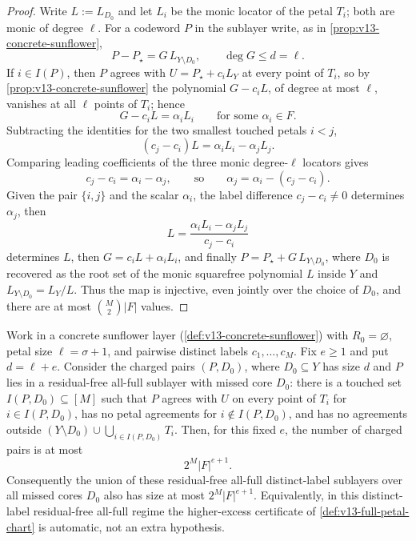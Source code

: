 \begin{proof}
Write $L:=L_{D_0}$ and let $L_i$ be the monic locator of the petal $T_i$; both are monic of degree $\ell$.  For a codeword $P$ in the sublayer write, as in \cref{prop:v13-concrete-sunflower},
\[
        P-P_\star=G\,L_{Y\setminus D_0},
        \qquad \deg G\le d=\ell .
\]
If $i\in I(P)$, then $P$ agrees with $U=P_\star+c_iL_Y$ at every point of $T_i$, so by \cref{prop:v13-concrete-sunflower} the polynomial $G-c_iL$, of degree at most $\ell$, vanishes at all $\ell$ points of $T_i$; hence
\[
        G-c_iL=\alpha_iL_i
        \qquad\text{for some }\alpha_i\in F .
\]
Subtracting the identities for the two smallest touched petals $i<j$,
\[
        (c_j-c_i)L=\alpha_iL_i-\alpha_jL_j .
\]
Comparing leading coefficients of the three monic degree-$\ell$ locators gives
\[
        c_j-c_i=\alpha_i-\alpha_j,
        \qquad\text{so}\qquad
        \alpha_j=\alpha_i-(c_j-c_i).
\]
Given the pair $\{i,j\}$ and the scalar $\alpha_i$, the label difference $c_j-c_i\ne0$ determines $\alpha_j$, then
\[
        L=\frac{\alpha_iL_i-\alpha_jL_j}{c_j-c_i}
\]
determines $L$, then $G=c_iL+\alpha_iL_i$, and finally $P=P_\star+G\,L_{Y\setminus D_0}$, where $D_0$ is recovered as the root set of the monic squarefree polynomial $L$ inside $Y$ and $L_{Y\setminus D_0}=L_Y/L$.  Thus the map is injective, even jointly over the choice of $D_0$, and there are at most $\binom M2|F|$ values.
\end{proof}

\begin{proposition}\label{prop:v13-distinct-excess-chart}
Work in a concrete sunflower layer \textup(\cref{def:v13-concrete-sunflower}\textup) with $R_0=\varnothing$, petal size $\ell=\sigma+1$, and pairwise distinct labels $c_1,\ldots,c_M$.  Fix $e\ge1$ and put $d=\ell+e$.  Consider the charged pairs $(P,D_0)$, where $D_0\subseteq Y$ has size $d$ and $P$ lies in a residual-free all-full sublayer with missed core $D_0$: there is a touched set $I(P,D_0)\subseteq[M]$ such that $P$ agrees with $U$ on every point of $T_i$ for $i\in I(P,D_0)$, has no petal agreements for $i\notin I(P,D_0)$, and has no agreements outside $(Y\setminus D_0)\cup\bigcup_{i\in I(P,D_0)}T_i$.  Then, for this fixed $e$, the number of charged pairs is at most
\[
        2^M |F|^{e+1}.
\]
Consequently the union of these residual-free all-full distinct-label sublayers over all missed cores $D_0$ also has size at most $2^M|F|^{e+1}$.  Equivalently, in this distinct-label residual-free all-full regime the higher-excess certificate of \cref{def:v13-full-petal-chart} is automatic, not an extra hypothesis.
\end{proposition}

